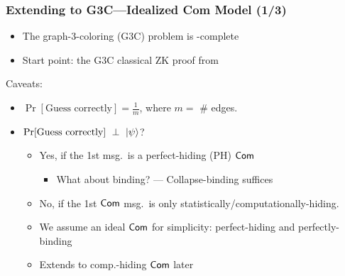 \documentclass[aspectratio=1610, 12pt, xcolor={dvipsnames}]{beamer}
\begin{document}
\begin{frame}
\frametitle{Extending to G3C---Idealized Com Model (1/3)}

\begin{itemize}
\item
The graph-3-coloring (G3C) problem is \NP-complete

\item
Start point: the G3C classical ZK proof from \cite{DBLP:conf/focs/GoldreichMW86}
\end{itemize}

Caveats:
\begin{itemize}
\item
$\Pr[\text{Guess correctly}] = \frac{1}{m}$, where $m=$ \# edges. 
\item
$\Pr[\text{Guess correctly}] ~\perp~ \ket{\psi}$?
\begin{itemize}
\item
Yes, if the 1st msg.\ is a perfect-hiding (PH) $\mathsf{Com}$
\begin{itemize}
\item
What about binding? --- Collapse-binding suffices \cite{DBLP:conf/eurocrypt/Unruh16}
\end{itemize}
\item 
No, if the 1st $\mathsf{Com}$ msg.\ is only statistically/computationally-hiding.
\item
We assume an ideal $\mathsf{Com}$ for simplicity: perfect-hiding and perfectly-binding
\item
Extends to comp.-hiding $\mathsf{Com}$ later 
\end{itemize} 
\end{itemize}
\end{frame}
\end{document}
